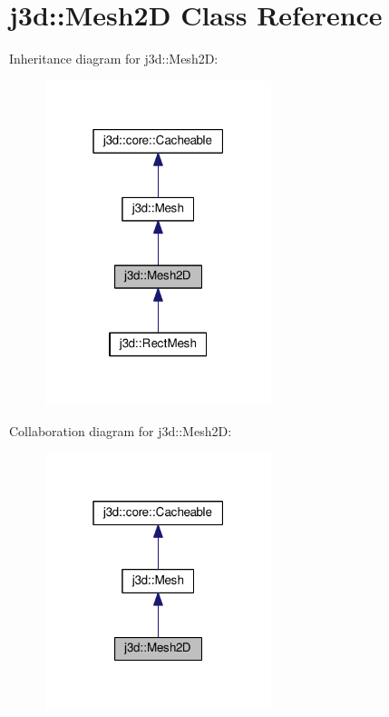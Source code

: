 \hypertarget{classj3d_1_1Mesh2D}{}\section{j3d\+:\+:Mesh2\+D Class Reference}
\label{classj3d_1_1Mesh2D}


Inheritance diagram for j3d\+:\+:Mesh2\+D\+:
\nopagebreak
\begin{figure}[H]
\begin{center}
\leavevmode
\includegraphics[width=187pt]{classj3d_1_1Mesh2D__inherit__graph}
\end{center}
\end{figure}


Collaboration diagram for j3d\+:\+:Mesh2\+D\+:
\nopagebreak
\begin{figure}[H]
\begin{center}
\leavevmode
\includegraphics[width=187pt]{classj3d_1_1Mesh2D__coll__graph}
\end{center}
\end{figure}
